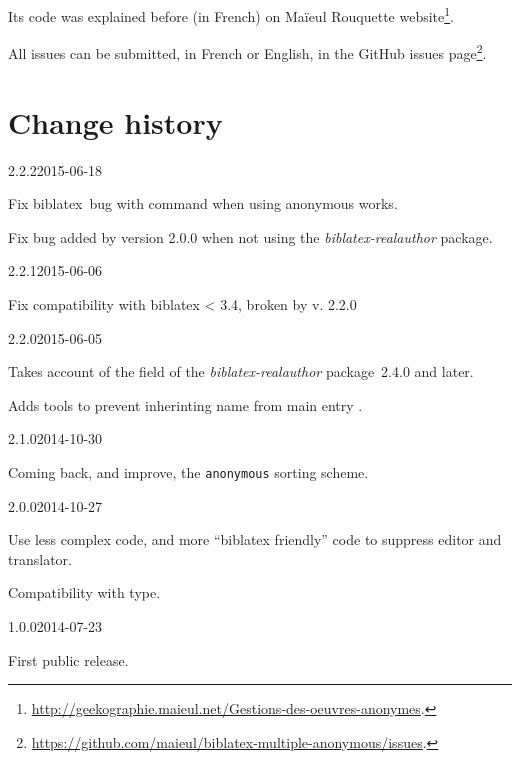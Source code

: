 \documentclass{ltxdockit}[2011/03/25]
\newcommand{\biblatex}{biblatex\xspace}
\begin{document}
Its code was explained before (in French) on Maïeul Rouquette website\footnote{\url{http://geekographie.maieul.net/Gestions-des-oeuvres-anonymes}.}.

All issues can be submitted, in French or English, in the GitHub issues page\footnote{\url{https://github.com/maieul/biblatex-multiple-anonymous/issues}.}.

\section{Change history}

\begin{changelog}

\begin{release}{2.2.2}{2015-06-18}
  \item Fix \biblatex\ bug with  \expandafter\cs\expandafter{\meta{xx}cites} command when using anonymous works.
  \item Fix bug added by version 2.0.0 when not using the \emph{biblatex-realauthor} package.
 \end{release}
\begin{release}{2.2.1}{2015-06-06}
 \item Fix compatibility with biblatex < 3.4, broken by v. 2.2.0
\end{release}
\begin{release}{2.2.0}{2015-06-05}
  \item Takes account of the  field of the \emph{biblatex-realauthor} package~2.4.0 and later.
  \item Adds tools to prevent inherinting name from main entry .
\end{release}

\begin{release}{2.1.0}{2014-10-30}
\item Coming back, and improve, the \verb+anonymous+ sorting scheme.
\end{release}

\begin{release}{2.0.0}{2014-10-27}
\item Use less complex code, and more \enquote{biblatex friendly} code to suppress editor and translator.
\item Compatibility with  type.
\end{release}

\begin{release}{1.0.0}{2014-07-23}
\item First public release.
\end{release}
\end{changelog}
\end{document}
